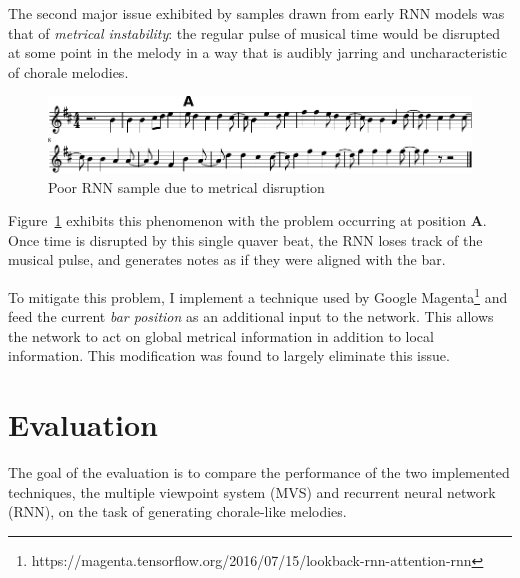 \documentclass[12pt,a4paper,twoside,openright]{report}
\newcommand{\todo}{\textcolor{red}{\textbf{todo}~}}
\begin{document}
The second major issue exhibited by samples drawn from early RNN models was that
of \emph{metrical instability}: the regular pulse of musical time would be
disrupted at some point in the melody in a way that is audibly jarring and
uncharacteristic of chorale melodies.

\begin{figure}[H]
\centering
\includegraphics[width=0.9\linewidth]{figs/rnn_likes_syncopation.pdf}
\caption{Poor RNN sample due to metrical disruption}
\label{fig:rnn-instability}
\end{figure}

Figure~\ref{fig:rnn-instability} exhibits this phenomenon with the problem
occurring at position \textbf{A}. Once time is disrupted by this single quaver
beat, the RNN loses track of the musical pulse, and generates notes as if they
were aligned with the bar.

To mitigate this problem, I implement a technique used by Google
Magenta\footnote{https://magenta.tensorflow.org/2016/07/15/lookback-rnn-attention-rnn}
and feed the current \emph{bar position} as an additional input to the network.
This allows the network to act on global metrical information in addition to
local information. This modification was found to largely eliminate this issue.

%

\chapter{Evaluation}\label{chap:eval}

The goal of the evaluation is to compare the performance of the two implemented
techniques, the multiple viewpoint system (MVS) and recurrent neural network
(RNN), on the task of generating chorale-like melodies.
\end{document}
